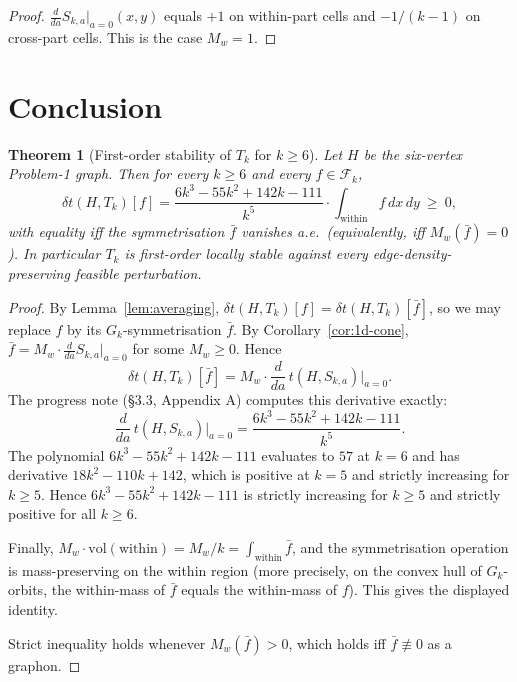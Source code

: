 \documentclass[11pt]{amsart}
\newtheorem{theorem}{Theorem}[section]
\theoremstyle{definition}
\newcommand{\1}{\mathbf 1}
\newcommand{\dd}{\,d}
\begin{document}
\begin{proof}
$\frac{d}{da}S_{k,a}|_{a=0}(x,y)$ equals $+1$ on within-part cells and
$-1/(k-1)$ on cross-part cells.  This is the case $M_w=1$.
\end{proof}

\section{Conclusion}

\begin{theorem}[First-order stability of $T_k$ for $k\ge 6$]
\label{thm:first-order-stability}
Let $H$ be the six-vertex Problem-1 graph.  Then for every $k\ge 6$ and every
$f\in\mathcal F_k$,
\[
   \delta t(H,T_k)[f]
   = \frac{6k^3-55k^2+142k-111}{k^5}\cdot
   \int_{\mathrm{within}} f \dd x\dd y
   \ \ge\ 0,
\]
with equality iff the symmetrisation $\bar f$ vanishes a.e.\ (equivalently,
iff $M_w(\bar f) = 0$).  In particular $T_k$ is first-order locally stable
against every edge-density-preserving feasible perturbation.
\end{theorem}

\begin{proof}
By Lemma~\ref{lem:averaging}, $\delta t(H,T_k)[f] = \delta t(H,T_k)[\bar f]$,
so we may replace $f$ by its $G_k$-symmetrisation $\bar f$.  By
Corollary~\ref{cor:1d-cone}, $\bar f = M_w\cdot \frac{d}{da}S_{k,a}|_{a=0}$
for some $M_w\ge 0$.  Hence
\[
   \delta t(H,T_k)[\bar f]
   = M_w\cdot \frac{d}{da}\,t(H,S_{k,a})\Big|_{a=0}.
\]
The progress note (§3.3, Appendix A) computes this derivative exactly:
\[
   \frac{d}{da}\,t(H,S_{k,a})\Big|_{a=0}
   = \frac{6k^3-55k^2+142k-111}{k^5}.
\]
The polynomial $6k^3-55k^2+142k-111$ evaluates to $57$ at $k=6$ and has
derivative $18k^2-110k+142$, which is positive at $k=5$ and strictly
increasing for $k\ge 5$.  Hence $6k^3-55k^2+142k-111$ is strictly increasing
for $k\ge 5$ and strictly positive for all $k\ge 6$.

Finally, $M_w\cdot \mathrm{vol}(\mathrm{within}) = M_w/k = \int_{\mathrm{within}}\bar f$,
and the symmetrisation operation is mass-preserving on the within region (more
precisely, on the convex hull of $G_k$-orbits, the within-mass of $\bar f$
equals the within-mass of $f$).  This gives the displayed identity.

Strict inequality holds whenever $M_w(\bar f)>0$, which holds iff $\bar f\not\equiv 0$ as a graphon.
\end{proof}
\end{document}
